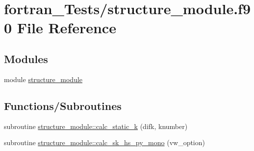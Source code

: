 \hypertarget{structure__module_8f90}{}\section{fortran\+\_\+\+Tests/structure\+\_\+module.f90 File Reference}
\label{structure__module_8f90}
\subsection*{Modules}
\begin{DoxyCompactItemize}
\item 
module \hyperlink{namespacestructure__module}{structure\+\_\+module}
\end{DoxyCompactItemize}
\subsection*{Functions/\+Subroutines}
\begin{DoxyCompactItemize}
\item 
subroutine \hyperlink{namespacestructure__module_ab97534da0aa35a8aa92ee9f232e807cf}{structure\+\_\+module\+::calc\+\_\+static\+\_\+k} (difk, knumber)
\item 
subroutine \hyperlink{namespacestructure__module_a47b67b8011b192c77c8c7c5474b413af}{structure\+\_\+module\+::calc\+\_\+sk\+\_\+hs\+\_\+py\+\_\+mono} (vw\+\_\+option)
\end{DoxyCompactItemize}
